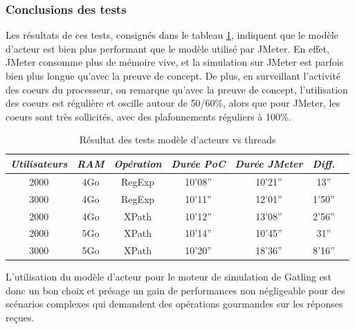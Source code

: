 \subsubsection{Conclusions des tests}
Les résultats de ces tests, consignés dans le tableau \ref{result_tests}, indiquent que le modèle d'acteur est bien plus performant que le modèle utilisé par JMeter. En effet, JMeter consomme plus de mémoire vive, et la simulation sur JMeter est parfois bien plus longue qu'avec la preuve de concept. De plus, en surveillant l'activité des coeurs du processeur, on remarque qu'avec la preuve de concept, l'utilisation des coeurs est régulière et oscille autour de 50/60\%, alors que pour JMeter, les coeurs sont très sollicités, avec des plafonnements réguliers à 100\%.
\begin{center}
\begin{table}[h]
\begin{tabular}{c c c c c c l}
\em{Utilisateurs} & \em{RAM} & \em{Opération} & \em{Durée PoC} & \em{Durée JMeter} & \em{Diff.}\\ \hline
2000 & 4Go & RegExp & 10'08'' & 10'21'' & 13''\\
3000 & 4Go & RegExp & 10'11'' & 12'01'' & 1'50''\\
2000 & 4Go & XPath & 10'12'' & 13'08'' & 2'56''\\
2000 & 5Go & XPath & 10'14'' & 10'45'' & 31''\\
3000 & 5Go & XPath & 10'20'' & 18'36'' & 8'16''\\
\end{tabular}
\caption{Résultat des tests modèle d'acteurs vs threads}
\label{result_tests}
\end{table}
\end{center}
L'utilisation du modèle d'acteur pour le moteur de simulation de Gatling est donc un bon choix et présage un gain de performances non négligeable pour des scénarios complexes qui demandent des opérations gourmandes sur les réponses reçues.

